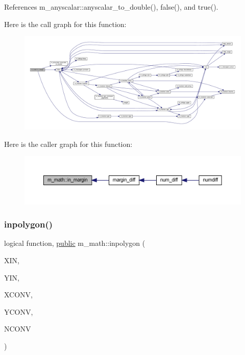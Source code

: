 References m\+\_\+anyscalar\+::anyscalar\+\_\+to\+\_\+double(), false(), and true().

Here is the call graph for this function\+:
\nopagebreak
\begin{figure}[H]
\begin{center}
\leavevmode
\includegraphics[width=350pt]{namespacem__math_aa53768584a404262081f26d5d61e1e03_cgraph}
\end{center}
\end{figure}
Here is the caller graph for this function\+:
\nopagebreak
\begin{figure}[H]
\begin{center}
\leavevmode
\includegraphics[width=350pt]{namespacem__math_aa53768584a404262081f26d5d61e1e03_icgraph}
\end{center}
\end{figure}
\mbox{\label{namespacem__math_a8a690554ceefdd859166fd1c44b40969}} 
\subsubsection{\texorpdfstring{inpolygon()}{inpolygon()}}
{\footnotesize\ttfamily logical function, \hyperlink{M__stopwatch_83_8txt_a2f74811300c361e53b430611a7d1769f}{public} m\+\_\+math\+::inpolygon (\begin{DoxyParamCaption}\item[{integer, intent(\hyperlink{M__journal_83_8txt_afce72651d1eed785a2132bee863b2f38}{in})}]{X\+IN,  }\item[{integer, intent(\hyperlink{M__journal_83_8txt_afce72651d1eed785a2132bee863b2f38}{in})}]{Y\+IN,  }\item[{integer, dimension(nconv)}]{X\+C\+O\+NV,  }\item[{integer, dimension(nconv)}]{Y\+C\+O\+NV,  }\item[{integer, intent(\hyperlink{M__journal_83_8txt_afce72651d1eed785a2132bee863b2f38}{in})}]{N\+C\+O\+NV }\end{DoxyParamCaption})}



